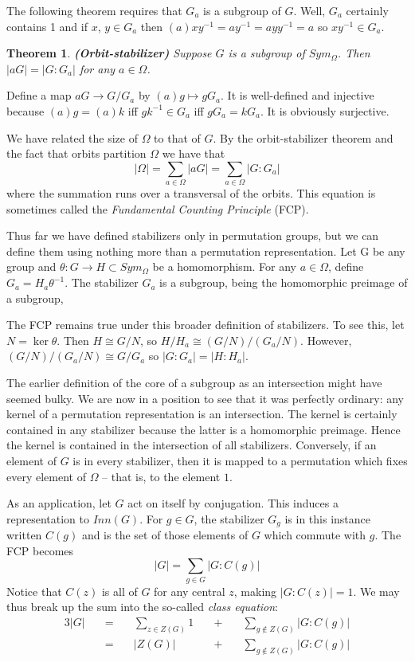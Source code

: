 \documentclass[letterpaper]{article}
\newtheorem{theorem}{Theorem}[section]
\newenvironment{proof}[1][Proof]{\begin{trivlist}
\item[\hskip \labelsep {\bfseries #1}]}{\end{trivlist}}
\begin{document}
The following theorem requires that $G_a$ is a subgroup of $G$. Well, $G_a$ certainly contains 1 and if $x$, $y \in G_a$ then $(a)xy^{-1} = ay^{-1} = ayy^{-1} = a$ so $xy^{-1} \in G_a$.

\begin{theorem}
\emph{\textbf{(Orbit-stabilizer)}}
Suppose $G$ is a subgroup of $Sym_\Omega$. Then $|aG| = |G \colon G_a|$ for any $a \in \Omega$.
\end{theorem}
\begin{proof}
Define a map $aG \rightarrow G/G_a$ by $(a)g \mapsto gG_a$. It is well-defined and injective because $(a)g = (a)k$ iff $gk^{-1} \in G_a$ iff $gG_a = kG_a$. It is obviously surjective.
\end{proof}

We have related the size of $\Omega$ to that of $G$. By the orbit-stabilizer theorem and the fact that orbits partition $\Omega$ we have that
\[|\Omega| = \sum_{a \in \Omega} |aG| = \sum_{a \in \Omega} |G \colon G_a|\]
where the summation runs over a transversal of the orbits. This equation is sometimes called the \emph{Fundamental Counting Principle} (FCP).

Thus far we have defined stabilizers only in permutation groups, but we can define them using nothing more than a permutation representation. Let G be any group and $\theta \colon G \rightarrow H \subset Sym_\Omega$ be a homomorphism. For any $a \in \Omega$, define $G_a = H_a\theta^{-1}$. The stabilizer $G_a$ is a subgroup, being the homomorphic  preimage of a subgroup,

The FCP remains true under this broader definition of stabilizers. To see this, let $N = \ker \theta$. Then $H \cong G/N$, so $H/H_a \cong (G/N)/(G_a/N)$. However, $(G/N)/(G_a/N) \cong G/G_a$ so $|G \colon G_a| = |H \colon H_a|$.

The earlier definition of the core of a subgroup as an intersection might have seemed bulky. We are now in a position to see that it was perfectly ordinary: any kernel of a permutation representation is an intersection. The kernel is certainly contained in any stabilizer because the latter is a homomorphic preimage. Hence the kernel is contained in the intersection of all stabilizers. Conversely, if an element of $G$ is in every stabilizer, then it is mapped to a permutation which fixes every element of $\Omega$ -- that is, to the element $1$.

As an application, let $G$ act on itself by conjugation. This induces a representation to $Inn(G)$. For $g \in G$, the stabilizer $G_g$ is in this instance written $C(g)$ and is the set of those elements of $G$ which commute with $g$. The FCP becomes
\[|G| = \sum_{g \in G} |G \colon C(g)|\]
Notice that $C(z)$ is all of $G$ for any central $z$, making $|G \colon C(z)| = 1$. We may thus break up the sum into the so-called \emph{class equation}:
\begin{alignat*}{3}
|G| \quad &=& \quad \sum_{z \in Z(G)} 1 \quad &+& \quad \sum_{g \not \in Z(G)} |G \colon C(g)| \\
    &=& \quad |Z(G)|              \quad &+& \quad \sum_{g \not \in Z(G)} |G \colon C(g)|
\end{alignat*}
\end{document}
